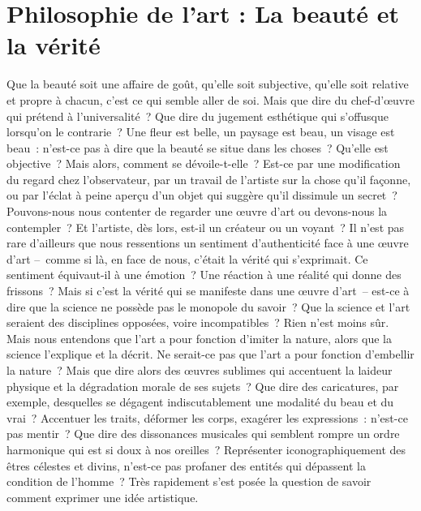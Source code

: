 \documentclass[
  10pt,
  french,
  a5paper,
  openany]{book}
\begin{document}

\renewcommand{\chaptermark}[1]{\markboth{\footnotesize\space#1}{}}
\pagestyle{themes}

\hypertarget{philosophie-de-lart-la-beautuxe9-et-la-vuxe9rituxe9}{%
\chapter{Philosophie de l'art : La beauté et la vérité}\label{philosophie-de-lart-la-beautuxe9-et-la-vuxe9rituxe9}}

Que la beauté soit une affaire de goût, qu'elle soit subjective, qu'elle soit relative et propre à chacun, c'est ce qui semble aller de soi. Mais que dire du chef-d'œuvre qui prétend à l'universalité~? Que dire du jugement esthétique qui s'offusque lorsqu'on le contrarie~? Une fleur est belle, un paysage est beau, un visage est beau~: n'est-ce pas à dire que la beauté se situe dans les choses~? Qu'elle est objective~? Mais alors, comment se dévoile-t-elle~? Est-ce par une modification du regard chez l'observateur, par un travail de l'artiste sur la chose qu'il façonne, ou par l'éclat à peine aperçu d'un objet qui suggère qu'il dissimule un secret~? Pouvons-nous nous contenter de regarder une œuvre d'art ou devons-nous la contempler~? Et l'artiste, dès lors, est-il un créateur ou un voyant~? Il n'est pas rare d'ailleurs que nous ressentions un sentiment d'authenticité face à une œuvre d'art --~comme si là, en face de nous, c'était la vérité qui s'exprimait. Ce sentiment équivaut-il à une émotion~? Une réaction à une réalité qui donne des frissons~? Mais si c'est la vérité qui se manifeste dans une œuvre d'art~-- est-ce à dire que la science ne possède pas le monopole du savoir~? Que la science et l'art seraient des disciplines opposées, voire incompatibles~? Rien n'est moins sûr. Mais nous entendons que l'art a pour fonction d'imiter la nature, alors que la science l'explique et la décrit. Ne serait-ce pas que l'art a pour fonction d'embellir la nature~? Mais que dire alors des œuvres sublimes qui accentuent la laideur physique et la dégradation morale de ses sujets~? Que dire des caricatures, par exemple, desquelles se dégagent indiscutablement une modalité du beau et du vrai~? Accentuer les traits, déformer les corps, exagérer les expressions~: n'est-ce pas mentir~? Que dire des dissonances musicales qui semblent rompre un ordre harmonique qui est si doux à nos oreilles~? Représenter iconographiquement des êtres célestes et divins, n'est-ce pas profaner des entités qui dépassent la condition de l'homme~? Très rapidement s'est posée la question de savoir comment exprimer une idée artistique.
\end{document}
